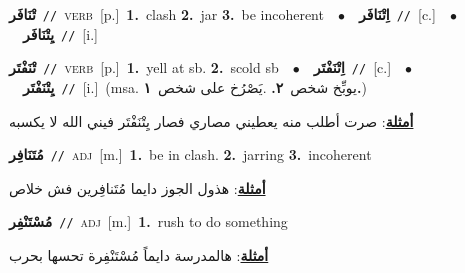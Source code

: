 \documentclass[10pt,a4paper,twoside]{article} %
\begin{document}
\begin{multicols}{2}
{\setlength\topsep{0pt}\textbf{\foreignlanguage{arabic}{تْنَافَر}}\ {\color{gray}\texttt{//}\color{black}}\ \textsc{verb}\ [p.]\ \textbf{1.}~clash  \textbf{2.}~jar  \textbf{3.}~be incoherent\ \ $\bullet$\ \ \setlength\topsep{0pt}\textbf{\foreignlanguage{arabic}{اِتْنَافَر}}\ {\color{gray}\texttt{//}\color{black}}\ [c.]\ \ $\bullet$\ \ \setlength\topsep{0pt}\textbf{\foreignlanguage{arabic}{يِتْنَافَر}}\ {\color{gray}\texttt{//}\color{black}}\ [i.]\ } \vspace{2mm}

{\setlength\topsep{0pt}\textbf{\foreignlanguage{arabic}{تْنَفْتَر}}\ {\color{gray}\texttt{//}\color{black}}\ \textsc{verb}\ [p.]\ \textbf{1.}~yell at sb.  \textbf{2.}~scold sb\ \ $\bullet$\ \ \setlength\topsep{0pt}\textbf{\foreignlanguage{arabic}{اِتْنَفْتَر}}\ {\color{gray}\texttt{//}\color{black}}\ [c.]\ \ $\bullet$\ \ \setlength\topsep{0pt}\textbf{\foreignlanguage{arabic}{يِتْنَفْتَر}}\ {\color{gray}\texttt{//}\color{black}}\ [i.]\ \color{gray}(msa. \foreignlanguage{arabic}{يوبِّخ شخص}~\foreignlanguage{arabic}{\textbf{٢.}}  .\foreignlanguage{arabic}{يَصْرُخ على شخص}~\foreignlanguage{arabic}{\textbf{١.}})\color{black}\  \begin{flushright}\color{gray}\foreignlanguage{arabic}{\textbf{\underline{\foreignlanguage{arabic}{أمثلة}}}: صرت أطلب منه يعطيني مصاري فصار يِتْنَفْتَر فيني الله لا يكسبه}\end{flushright}\color{black}} \vspace{2mm}

{\setlength\topsep{0pt}\textbf{\foreignlanguage{arabic}{مُتَنَافِر}}\ {\color{gray}\texttt{//}\color{black}}\ \textsc{adj}\ [m.]\ \textbf{1.}~be in clash.  \textbf{2.}~jarring  \textbf{3.}~incoherent\  \begin{flushright}\color{gray}\foreignlanguage{arabic}{\textbf{\underline{\foreignlanguage{arabic}{أمثلة}}}: هذول الجوز دايما مُتَنافِرين فش خلاص}\end{flushright}\color{black}} \vspace{2mm}

{\setlength\topsep{0pt}\textbf{\foreignlanguage{arabic}{مُسْتَنْفِر}}\ {\color{gray}\texttt{//}\color{black}}\ \textsc{adj}\ [m.]\ \textbf{1.}~rush to do something\  \begin{flushright}\color{gray}\foreignlanguage{arabic}{\textbf{\underline{\foreignlanguage{arabic}{أمثلة}}}: هالمدرسة دايماً مُسْتَنْفِرة تحسها بحرب}\end{flushright}\color{black}} \vspace{2mm}


\end{multicols}
\end{document}
